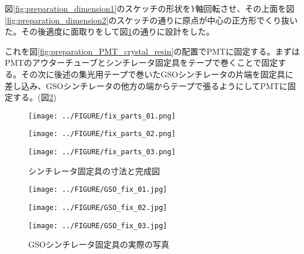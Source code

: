 \documentclass[../../main.tex]{subfiles}
\numberwithin{equation}{section}
\numberwithin{table}{section}
\numberwithin{figure}{section}
\begin{document}
  図\ref{fig:preparation_dimension1}のスケッチの形状を$Y$軸回転させ、その上面を図\ref{fig:preparation_dimension2}のスケッチの通りに原点が中心の正方形でくり抜いた。その後適度に面取りをして図\ref{fig:preparation_dimension3}の通りに設計をした。

  これを図\ref{fig:preparation_PMT_crystal_resin}の配置でPMTに固定する。まずはPMTのアウターチューブとシンチレータ固定具をテープで巻くことで固定する。その次に後述の集光用テープで巻いたGSOシンチレータの片端を固定具に差し込み、GSOシンチレータの他方の端からテープで張るようにしてPMTに固定する。(図\ref{fig:preparation_GSO_fix})
  \begin{figure}[H]
    \begin{minipage}[b]{0.48\columnwidth}
      \centering
      \texttt{[image: ../FIGURE/fix\_parts\_01.png]}
      \label{fig:preparation_dimension1}
    \end{minipage}
    \hspace{0.04\columnwidth} %
    \begin{minipage}[b]{0.48\columnwidth}
      \centering
      \texttt{[image: ../FIGURE/fix\_parts\_02.png]}
      \label{fig:preparation_dimension2}
    \end{minipage}
    \begin{minipage}[b]{0.48\columnwidth}
      \centering
      \texttt{[image: ../FIGURE/fix\_parts\_03.png]}
      \label{fig:preparation_dimension3}
    \end{minipage}
    \caption{シンチレータ固定具の寸法と完成図}
  \end{figure}

  \begin{figure}[H]
    \begin{minipage}[b]{0.4\columnwidth}
      \centering
      \texttt{[image: ../FIGURE/GSO\_fix\_01.jpg]}
      \label{fig:preparation_GSO_fix_01}
    \end{minipage}
    \hspace{0.04\columnwidth} %
    \begin{minipage}[b]{0.4\columnwidth}
      \centering
      \texttt{[image: ../FIGURE/GSO\_fix\_02.jpg]}
      \label{fig:preparation_GSO_fix_02}
    \end{minipage}
    \begin{minipage}[b]{0.4\columnwidth}
      \centering
      \texttt{[image: ../FIGURE/GSO\_fix\_03.jpg]}
      \label{fig:preparation_GSO_fix_03}
    \end{minipage}
    \caption{GSOシンチレータ固定具の実際の写真}\label{fig:preparation_GSO_fix}
  \end{figure}
\end{document}
